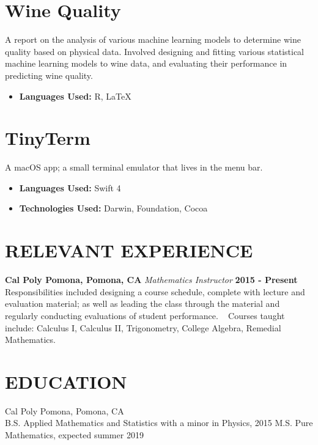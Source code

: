 \documentclass[margin]{res}
\begin{document}
\begin{resume}
\normalsize{\section{Wine Quality}}
A report on the analysis of various machine learning models to determine wine
quality based on physical data.
Involved designing and fitting various statistical machine learning models to wine data, and
evaluating their performance in predicting wine quality.
\begin{itemize}
\item {\bf Languages Used: }\newline R, LaTeX
\end{itemize}

\normalsize{\section{TinyTerm}} A macOS app; a small terminal emulator that
lives in the menu bar.
\begin{multicols}{2}
\begin{itemize}
\item {\bf Languages Used: } \newline Swift 4
  \columnbreak
\item {\bf Technologies Used: } \newline Darwin, Foundation, Cocoa
\end{itemize}
\end{multicols}

\section{RELEVANT EXPERIENCE}
{\bf Cal Poly Pomona, Pomona, CA}\newline
{\it Mathematics Instructor}\newline
{\bf 2015 - Present}\newline
Responsibilities included designing a course schedule, complete with lecture and
evaluation material; as well as leading the class through the material and
regularly conducting evaluations of student performance.\newline
\ \newline
Courses taught include: Calculus I, Calculus II, Trigonometry, College Algebra,
Remedial Mathematics.

\section{EDUCATION}
Cal Poly Pomona, Pomona, CA \\
B.S. Applied Mathematics and Statistics with a minor in Physics, 2015 \newline
M.S. Pure Mathematics, expected summer 2019


\end{resume}
\end{document}
